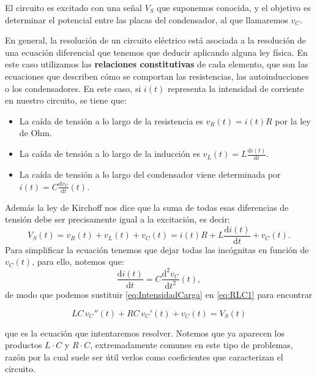 El circuito es excitado con una señal $V_S$ que suponemos conocida, y el objetivo es determinar el potencial entre las placas del condensador, al que llamaremos $v_C$.

En general, la resolución de un circuito eléctrico está asociada a la resolución de una ecuación diferencial que tenemos que deducir aplicando alguna ley física. En este caso utilizamos las \textbf{relaciones constitutivas} de cada elemento, que son las ecuaciones que describen cómo se comportan las resistencias, las autoinducciones o los condensadores. En este caso, si $i(t)$ representa la intensidad de corriente en nuestro circuito, se tiene que:

\begin{itemize}
\item La caída de tensión a lo largo de la resistencia es $v_R(t) = i(t) R$ por la ley de Ohm.
\item La caída de tensión a lo largo de la inducción es $v_L(t) = L\frac{\text{d}i(t)}{\text{d}t}$.
\item La caída de tensión a lo largo del condensador viene determinada por $i(t) = C\frac{\text{d}v_C}{\text{d}t}(t)$.
\end{itemize}

Además la ley de Kirchoff nos dice que la suma de todas esas diferencias de tensión debe ser precisamente igual a la excitación, es decir:
\begin{equation}
  \label{eq:RLC1}
  V_S(t) = v_R(t) + v_L(t) + v_C(t) = i(t) R + L\frac{\text{d}i(t)}{\text{d}t} + v_C(t).
\end{equation}
Para simplificar la ecuación tenemos que dejar todas las incógnitas en función de $v_C(t)$, para ello, notemos que:
\begin{equation}
  \label{eq:IntensidadCarga}
  \frac{\text{d}i(t)}{\text{d}t} = C\frac{\text{d}^2v_C}{\text{d}t^2}(t),
\end{equation}
de modo que podemos sustituir \eqref{eq:IntensidadCarga} en \eqref{eq:RLC1} para encontrar
\begin{mybox}\vspace{-5mm}
  \begin{equation}
    \label{eq:RLC}
    LC\, v_C''(t) + RC\, v_C'(t) + v_C(t) = V_S(t)
  \end{equation}
\end{mybox}
que es la ecuación que intentaremos resolver. Notemos que ya aparecen los productos $L\cdot C$ y $R\cdot C$, extremadamente comunes en este tipo de problemas, razón por la cual suele ser útil verlos como coeficientes que caracterizan el circuito.







